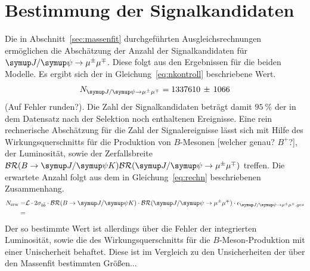\section{Bestimmung der Signalkandidaten}
Die in Abschnitt~\ref{sec:massenfit} durchgeführten Ausgleichsrechnungen ermöglichen die Abschätzung der Anzahl der Signalkandidaten für $\kontroll$. Diese folgt aus den Ergebnissen für die beiden Modelle. Es ergibt sich der in Gleichung~\eqref{eq:nkontroll} beschriebene Wert.
%
\begin{equation}
  N_{\kontroll}=1337610\,\pm\,1066
  \label{eq:nkontroll}
\end{equation}
%
(Auf Fehler runden?). Die Zahl der Signalkandidaten beträgt damit $\SI{95}{\percent}$ der in dem Datensatz nach der Selektion noch enthaltenen Ereignisse.
Eine rein rechnerische Abschätzung für die Zahl der Signalereignisse lässt sich mit Hilfe des Wirkungsquerschnitts für die Produktion von $B$-Mesonen [welcher genau? $B^{+}$?], der Luminosität, sowie der Zerfallsbreite $\mathcal{BR}(B\rightarrow\jpsi K)\mathcal{BR}(\kontroll)$ treffen. Die erwartete Anzahl folgt aus dem in Gleichung~\eqref{eq:rechn} beschriebenen Zusammenhang.
%
\begin{equation}
  \begin{split}
    N_\text{erw}=&\mathcal{L}\cdot 2\sigma_{b\bar{b}}\cdot\mathcal{BR}(B\rightarrow\jpsi K)\cdot\mathcal{BR}(\kontroll)\cdot\epsilon_{\kontroll, ges}\\
    =&
  \end{split}
  \label{eq:rechn}
\end{equation}
%
Der so bestimmte Wert ist allerdings über die Fehler der integrierten Luminosität, sowie die des Wirkungsquerschnitts für die $B$-Meson-Produktion mit einer Unischerheit behaftet. Diese ist im Vergleich zu den Unsicherheiten der über den Massenfit bestimmten Größen...
